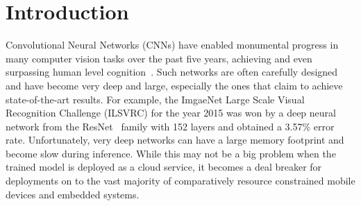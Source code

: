 \documentclass[../main]{subfiles}
\begin{document}
\section{Introduction}
    \label{sec:intro}
    Convolutional Neural Networks (CNNs) have enabled monumental progress in many computer vision tasks over the past five years, achieving and even surpassing human level cognition~\cite{szegedy2017inception,real2018regularized,hu2017squeeze}.
    Such networks are often carefully designed and have become very deep and large, especially the ones that claim to achieve state-of-the-art results.
    For example, the ImgaeNet Large Scale Visual Recognition Challenge (ILSVRC) for the year 2015 was won by a deep neural network from the ResNet~\cite{he2015deep} family with 152 layers and obtained a 3.57\% error rate.
    Unfortunately, very deep networks can have a large memory footprint and become slow during inference.
    While this may not be a big problem when the trained model is deployed as a cloud service, it becomes a deal breaker for deployments on to the vast majority of comparatively resource constrained mobile devices and embedded systems.
    
\end{document}
